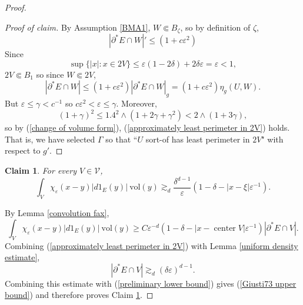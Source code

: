 \documentclass[reqno,12pt,letterpaper]{amsart}
\DeclareMathOperator{\cent}{center}
\newcommand{\vol}{\mathrm{vol}}
\newtheorem{claim}[theorem]{Claim}
\theoremstyle{definition}
\numberwithin{equation}{section}
\begin{document}
\begin{proof}
\begin{proof}[Proof of claim]
By Assumption \ref{BMA1}, $W \Subset B_\zeta$, so by definition of $\zeta$,
$$|\partial^* E \cap W|' \leq (1 + c\varepsilon^2)
$$
Since
$$\sup \{|x|: x \in 2V\} \leq \varepsilon(1 - 2\delta) + 2\delta\varepsilon = \varepsilon < 1,$$
$2V \Subset B_1$ so since $W \Subset 2V$,
$$|\partial^* E \cap W| \leq (1 + c\varepsilon^2)|\partial^* E \cap W|_g = (1 + c\varepsilon^2)\eta_g(U, W).$$
But $\varepsilon \leq \gamma < c^{-1}$ so $c\varepsilon^2 < \varepsilon \leq \gamma$.
Moreover,
$$(1 + \gamma)^2 \leq 1.4^2 \wedge (1 + 2\gamma + \gamma^2) < 2 \wedge (1 + 3\gamma),$$
so by (\ref{change of volume form}), (\ref{approximately least perimeter in 2V}) holds.
That is, we have selected $\Gamma$ so that ``$U$ sort-of has least perimeter in $2V$" with respect to $g'$.
\end{proof}

\begin{claim}\label{BMC1.5}
For every $V \in \mathcal V$,
\begin{equation}\label{Giusti73 upper bound}
\int_V \chi_\varepsilon(x - y) |d1_E(y)| ~\vol(y) \gtrsim_d \frac{\delta^{d - 1}}{\varepsilon}(1 - \delta - |x - \xi|\varepsilon^{-1}).
\end{equation}
\end{claim}
By Lemma \ref{convolution fax},
\begin{equation}\label{preliminary lower bound}
\int_V \chi_\varepsilon(x - y) |d1_E(y)| ~\vol(y) \geq C\varepsilon^{-d}(1 - \delta - |x - \cent V|\varepsilon^{-1}) |\partial^* E \cap V|.
\end{equation}
Combining (\ref{approximately least perimeter in 2V}) with Lemma \ref{uniform density estimate},
$$|\partial^* E \cap V| \gtrsim_d (\delta\varepsilon)^{d - 1}.$$
Combining this estimate with (\ref{preliminary lower bound}) gives (\ref{Giusti73 upper bound}) and therefore proves Claim \ref{BMC1.5}.


\end{proof}
\end{document}
